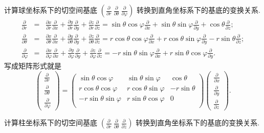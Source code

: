         \begin{example}
            计算球坐标系下的切空间基底
            $\left(\frac{\partial}{\partial r}\ \frac{\partial}{\partial \theta}\ \frac{\partial}{\partial \varphi}\right)$
            转换到直角坐标系下的基底的变换关系.
            \begin{eqnarray*}
                \frac{\partial}{\partial r}&=&\frac{\partial x}{\partial r}\frac{\partial }{\partial x}+\frac{\partial y}{\partial r}\frac{\partial }{\partial y}+\frac{\partial z}{\partial r}\frac{\partial }{\partial z}=\sin\theta \cos\varphi\frac{\partial }{\partial x}+\sin\theta \sin\varphi\frac{\partial }{\partial y}+\cos\theta\frac{\partial }{\partial z};\\
                \frac{\partial}{\partial \theta}&=&\frac{\partial x}{\partial \theta}\frac{\partial }{\partial x}+\frac{\partial y}{\partial \theta}\frac{\partial }{\partial y}+\frac{\partial z}{\partial \theta}\frac{\partial }{\partial z}=r\cos\theta \cos\varphi\frac{\partial }{\partial x}+r\cos\theta \sin\varphi\frac{\partial }{\partial y}-r\sin\theta\frac{\partial }{\partial z};\\
                \frac{\partial}{\partial \varphi}&=&\frac{\partial x}{\partial \varphi}\frac{\partial }{\partial x}+\frac{\partial y}{\partial \varphi}\frac{\partial }{\partial y}+\frac{\partial z}{\partial \varphi}\frac{\partial }{\partial z}=-r\sin\theta \sin\varphi\frac{\partial }{\partial x}+r\sin\theta \cos\varphi\frac{\partial }{\partial y}.
            \end{eqnarray*}
            写成矩阵形式就是
            \begin{equation}
                \begin{pmatrix}
                    \frac{\partial}{\partial r}\\
                    \frac{\partial}{\partial \theta}\\
                    \frac{\partial}{\partial \varphi}	
                \end{pmatrix}
                =
                \begin{pmatrix}
                    \sin\theta \cos\varphi&\sin\theta \sin\varphi&\cos\theta\\
                    r\cos\theta \cos\varphi&r\cos\theta \sin\varphi&-r\sin\theta\\
                    -r\sin\theta \sin\varphi&r\sin\theta \cos\varphi&0\\	
                \end{pmatrix}
                \begin{pmatrix}
                    \frac{\partial}{\partial x}\\
                    \frac{\partial}{\partial y}\\
                    \frac{\partial}{\partial z}	
                \end{pmatrix}.
            \end{equation}
        \end{example}
        \begin{exercise}
            计算柱坐标系下的切空间基底
            $\left(\frac{\partial}{\partial r}\ \frac{\partial}{\partial \theta}\ \frac{\partial}{\partial z}\right)$
            转换到直角坐标系下的基底的变换关系.
        \end{exercise}